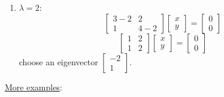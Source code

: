\documentclass{article}
\begin{document}
\begin{enumerate}
\begin{enumerate}
    \item $\lambda = 2$:
    \[ \left[\begin{array}{cc}
         3 - 2 & 2\\
         1 & 4 - 2
       \end{array}\right]  \left[\begin{array}{c}
         x\\
         y
       \end{array}\right] = \left[\begin{array}{c}
         0\\
         0
       \end{array}\right] \]
    \[ \left[\begin{array}{cc}
         1 & 2\\
         1 & 2
       \end{array}\right]  \left[\begin{array}{c}
         x\\
         y
       \end{array}\right] = \left[\begin{array}{c}
         0\\
         0
       \end{array}\right] \]
    choose an eigenvector $\left[\begin{array}{c}
      - 2\\
      1
    \end{array}\right]$.
  \end{enumerate}
\end{enumerate}
{\underline{More examples}}:
\end{document}
